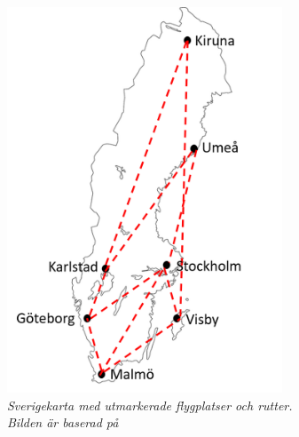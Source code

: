 \begin{figure}
    \hspace{0.4cm}
    \begin{subfigure}[b]{0.45\textwidth}
        \centering
        \includegraphics[width=0.9\textwidth]{Figures/Flygplan_rapport.png}
        \caption{\textsl{Sverigekarta med utmarkerade flygplatser och rutter. Bilden är baserad på \cite{SverigeKarta}}}
        \label{fig:Flygplan}
    \end{subfigure}
    \hfill
    \begin{subfigure}[b]{0.45\textwidth}
        \centering

\end{subfigure}
\end{figure}
